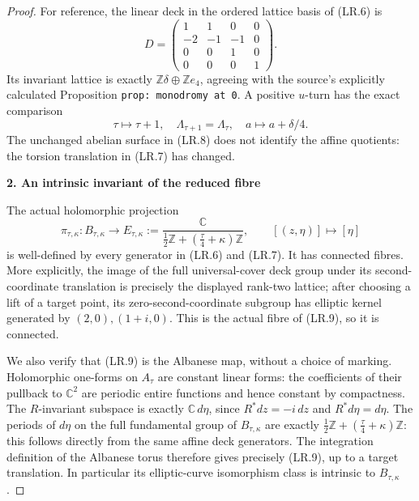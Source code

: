 \begin{proof}
For reference, the linear deck in the ordered lattice basis of
(LR.6) is
\[
 D=\begin{pmatrix}
 1&1&0&0\\-2&-1&-1&0\\0&0&1&0\\0&0&0&1
 \end{pmatrix}.
\]
Its invariant lattice is exactly
\(\mathbb Z\delta\oplus\mathbb Z e_4\), agreeing with the
source's explicitly calculated Proposition \texttt{prop: monodromy at 0}.
A positive \(u\)-turn has the exact comparison
\[
 \tau\longmapsto\tau+1,
 \quad \Lambda_{\tau+1}=\Lambda_\tau,
 \quad a\longmapsto a+\delta/4.                      \tag{LR.8}
\]
The unchanged abelian surface in (LR.8) does not identify the affine
quotients: the torsion translation in (LR.7) has changed.

\par

\medskip\noindent\textbf{2. An intrinsic invariant of the reduced fibre}

\par\nobreak

The actual holomorphic projection
\[
 \pi_{\tau,\kappa}:B_{\tau,\kappa}\longrightarrow
 E_{\tau,\kappa}:=
 \frac{\mathbb C}{\frac12\mathbb Z+
                       (\frac\tau4+\kappa)\mathbb Z},
 \qquad [(z,\eta)]\longmapsto[\eta]                  \tag{LR.9}
\]
is well-defined by every generator in (LR.6) and (LR.7).
It has connected fibres. More explicitly, the image of the full
universal-cover deck group under its second-coordinate translation
is precisely the displayed rank-two lattice; after choosing a lift
of a target point, its zero-second-coordinate subgroup has elliptic
kernel generated by \((2,0),(1+i,0)\). This is the actual fibre of
(LR.9), so it is connected.

We also verify that (LR.9) is the Albanese map, without a choice of
marking. Holomorphic one-forms on \(A_\tau\) are constant linear
forms: the coefficients of their pullback to \(\mathbb C^2\) are
periodic entire functions and hence constant by compactness. The
\(R\)-invariant subspace is exactly \(\mathbb C\,d\eta\), since
\(R^*dz=-i\,dz\) and \(R^*d\eta=d\eta\). The periods of
\(d\eta\) on the full fundamental group of \(B_{\tau,\kappa}\)
are exactly \(\frac12\mathbb Z+(\frac\tau4+\kappa)\mathbb Z\):
this follows directly from the same affine deck generators. The
integration definition of the Albanese torus therefore gives
precisely (LR.9), up to a target translation. In particular its
elliptic-curve isomorphism class is intrinsic to \(B_{\tau,\kappa}\).


\end{proof}
